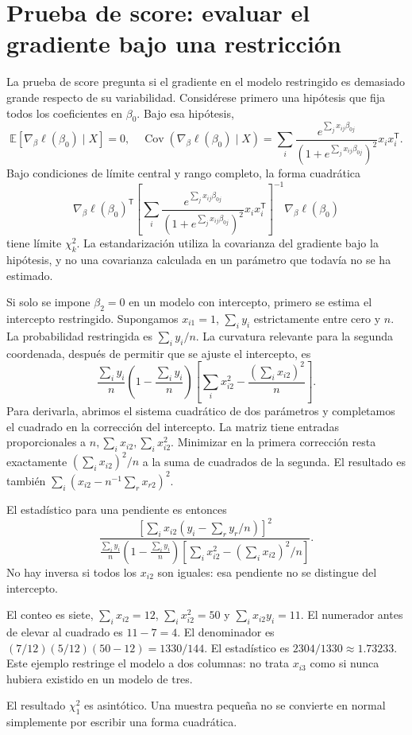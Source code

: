 \documentclass[11pt,a4paper]{article}
\newcommand{\E}{\mathbb E}
\newcommand{\T}{^{\mathsf T}}
\DeclareMathOperator{\Cov}{Cov}
\begin{document}
\clearpage
\section{Prueba de score: evaluar el gradiente bajo una restricción}\label{logit72}
La prueba de score pregunta si el gradiente en el modelo
restringido es demasiado grande respecto de su variabilidad.
Considérese primero una hipótesis que fija todos los coeficientes
en \(\beta_0\). Bajo esa hipótesis,
\[
\E[\nabla_\beta\ell(\beta_0)\mid X]=0,\quad
\Cov(\nabla_\beta\ell(\beta_0)\mid X)
=\sum_i\frac{e^{\sum_jx_{ij}\beta_{0j}}}
{(1+e^{\sum_jx_{ij}\beta_{0j}})^2}x_ix_i\T.
\]
Bajo condiciones de límite central y rango completo,
la forma cuadrática
\[
\nabla_\beta\ell(\beta_0)\T
\left[\sum_i\frac{e^{\sum_jx_{ij}\beta_{0j}}}
{(1+e^{\sum_jx_{ij}\beta_{0j}})^2}x_ix_i\T\right]^{-1}
\nabla_\beta\ell(\beta_0)
\]
tiene límite \(\chi^2_k\). La estandarización utiliza la covarianza
del gradiente bajo la hipótesis, y no una covarianza calculada
en un parámetro que todavía no se ha estimado.

Si solo se impone \(\beta_2=0\) en un modelo con intercepto,
primero se estima el intercepto restringido.
Supongamos \(x_{i1}=1\), \(\sum_i y_i\) estrictamente entre cero y \(n\).
La probabilidad restringida es \(\sum_i y_i/n\).
La curvatura relevante para la segunda coordenada,
después de permitir que se ajuste el intercepto, es
\[
\frac{\sum_i y_i}{n}
\left(1-\frac{\sum_i y_i}{n}\right)
\left[\sum_i x_{i2}^2-\frac{(\sum_i x_{i2})^2}{n}\right].
\]
Para derivarla, abrimos el sistema cuadrático de dos parámetros
y completamos el cuadrado en la corrección del intercepto.
La matriz tiene entradas proporcionales a
\(n,\sum_i x_{i2},\sum_i x_{i2}^2\).
Minimizar en la primera corrección resta exactamente
\((\sum_i x_{i2})^2/n\) a la suma de cuadrados de la segunda.
El resultado es también
\(\sum_i(x_{i2}-n^{-1}\sum_r x_{r2})^2\).

El estadístico para una pendiente es entonces
\[
\frac{\left[\sum_i x_{i2}
(y_i-\sum_r y_r/n)\right]^2}
{\frac{\sum_i y_i}{n}(1-\frac{\sum_i y_i}{n})
\left[\sum_i x_{i2}^2-(\sum_i x_{i2})^2/n\right]}.
\]
No hay inversa si todos los \(x_{i2}\) son iguales: esa pendiente
no se distingue del intercepto.

\begin{ejemplo}
El conteo es siete, \(\sum_i x_{i2}=12\),
\(\sum_i x_{i2}^2=50\) y \(\sum_i x_{i2}y_i=11\).
El numerador antes de elevar al cuadrado es \(11-7=4\).
El denominador es \((7/12)(5/12)(50-12)=1330/144\).
El estadístico es \(2304/1330\approx1.73233\).
Este ejemplo restringe el modelo a dos columnas: no trata
\(x_{i3}\) como si nunca hubiera existido en un modelo de tres.
\end{ejemplo}
El resultado \(\chi^2_1\) es asintótico. Una muestra pequeña
no se convierte en normal simplemente por escribir
una forma cuadrática.
\end{document}
